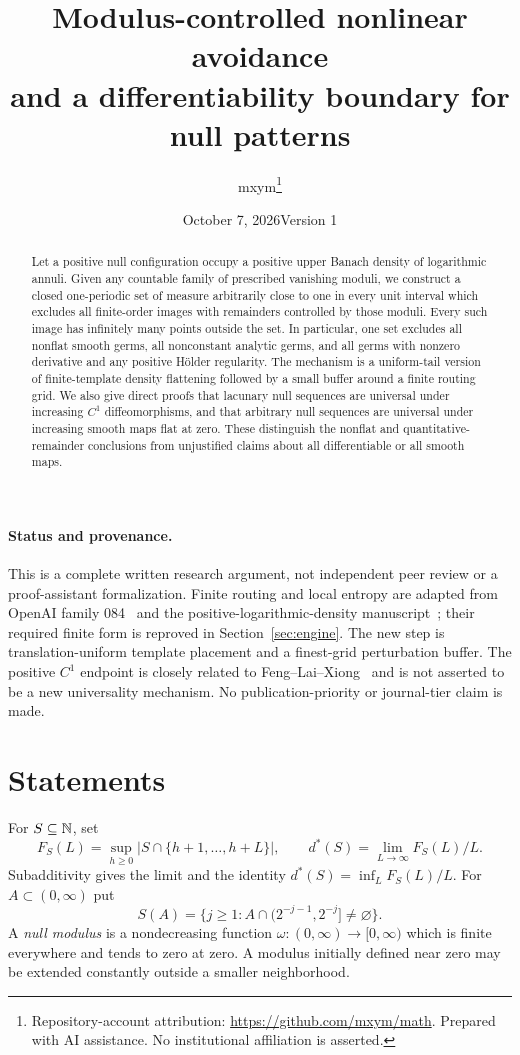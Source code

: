 \documentclass[11pt]{article}
\title{Modulus-controlled nonlinear avoidance\\and a differentiability boundary for null patterns}
\author{mxym\thanks{Repository-account attribution: \url{https://github.com/mxym/math}. Prepared with AI assistance. No institutional affiliation is asserted.}}
\date{October 7, 2026\quad Version 1}
\theoremstyle{remark}\newtheorem{remark}[theorem]{Remark}
\begin{document}
\maketitle
\begin{abstract}
Let a positive null configuration occupy a positive upper Banach density of logarithmic annuli. Given any countable family of prescribed vanishing moduli, we construct a closed one-periodic set of measure arbitrarily close to one in every unit interval which excludes all finite-order images with remainders controlled by those moduli. Every such image has infinitely many points outside the set. In particular, one set excludes all nonflat smooth germs, all nonconstant analytic germs, and all germs with nonzero derivative and any positive H\"older regularity. The mechanism is a uniform-tail version of finite-template density flattening followed by a small buffer around a finite routing grid. We also give direct proofs that lacunary null sequences are universal under increasing $C^1$ diffeomorphisms, and that arbitrary null sequences are universal under increasing smooth maps flat at zero. These distinguish the nonflat and quantitative-remainder conclusions from unjustified claims about all differentiable or all smooth maps.
\end{abstract}
\paragraph{Status and provenance.}
This is a complete written research argument, not independent peer review or a proof-assistant formalization. Finite routing and local entropy are adapted from OpenAI family 084~\cite{O084} and the positive-logarithmic-density manuscript~\cite{M004}; their required finite form is reproved in Section~\ref{sec:engine}. The new step is translation-uniform template placement and a finest-grid perturbation buffer. The positive $C^1$ endpoint is closely related to Feng--Lai--Xiong~\cite{FLX} and is not asserted to be a new universality mechanism. No publication-priority or journal-tier claim is made.

\section{Statements}
For $S\subseteq\mathbb N$, set
\[
 F_S(L)=\sup_{h\ge0}|S\cap\{h+1,\ldots,h+L\}|,
 \qquad d^*(S)=\lim_{L\to\infty}F_S(L)/L.
\]
Subadditivity gives the limit and the identity $d^*(S)=\inf_L F_S(L)/L$.
For $A\subset(0,\infty)$ put
\[
 S(A)=\{j\ge1:A\cap(2^{-j-1},2^{-j}]\ne\varnothing\}.
\]
A \emph{null modulus} is a nondecreasing function $\omega:(0,\infty)\to[0,\infty)$ which is finite everywhere and tends to zero at zero. A modulus initially defined near zero may be extended constantly outside a smaller neighborhood.
\end{document}
